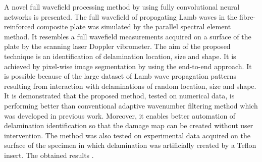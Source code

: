 A novel full wavefield processing method by using fully convolutional neural networks is presented.
The full wavefield of propagating Lamb waves in the fibre-reinforced composite plate was simulated by the parallel spectral element method.
It resembles a full wavefield measurements acquired on a surface of the plate by the scanning laser Doppler vibrometer.
The aim of the proposed technique is an identification of delamination location, size and shape.
It is achieved by pixel-wise image segmentation by using the end-to-end approach.
It is possible because of the large dataset of Lamb wave propagation patterns resulting from interaction with delaminations of random location, size and shape.
It is demonstrated that the proposed method, tested on numerical data, is performing better than conventional adaptive wavenumber filtering method which was developed in previous work.
Moreover, it enables better automation of delamination identification so that the damage map can be created without user intervention.
The method was also tested on experimental data acquired on the surface of the specimen in which delamination was artificially created by a Teflon insert.
The obtained results \DIFdelbegin {}\DIFdelend \DIFaddbegin {}\DIFaddend .
